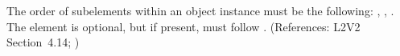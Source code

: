 The order of subelements within an \Event object instance must be
the following: , ,
.  The  element is
optional, but if present, must follow .
(References: L2V2 Section~4.14; )

